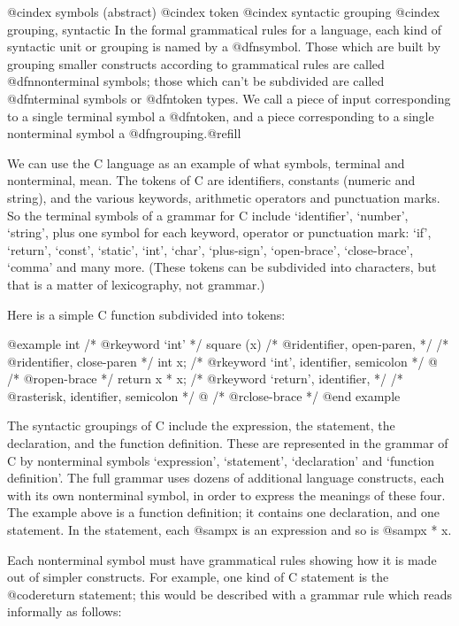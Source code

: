 @cindex symbols (abstract)
@cindex token
@cindex syntactic grouping
@cindex grouping, syntactic
In the formal grammatical rules for a language, each kind of syntactic unit
or grouping is named by a @dfn{symbol}.  Those which are built by grouping
smaller constructs according to grammatical rules are called
@dfn{nonterminal symbols}; those which can't be subdivided are called
@dfn{terminal symbols} or @dfn{token types}.  We call a piece of input
corresponding to a single terminal symbol a @dfn{token}, and a piece
corresponding to a single nonterminal symbol a @dfn{grouping}.@refill

We can use the C language as an example of what symbols, terminal and
nonterminal, mean.  The tokens of C are identifiers, constants (numeric and
string), and the various keywords, arithmetic operators and punctuation
marks.  So the terminal symbols of a grammar for C include `identifier',
`number', `string', plus one symbol for each keyword, operator or
punctuation mark: `if', `return', `const', `static', `int', `char',
`plus-sign', `open-brace', `close-brace', `comma' and many more.  (These
tokens can be subdivided into characters, but that is a matter of
lexicography, not grammar.)

Here is a simple C function subdivided into tokens:

@example
int             /* @r{keyword `int'} */
square (x)      /* @r{identifier, open-paren,} */
                /* @r{identifier, close-paren} */
     int x;     /* @r{keyword `int', identifier, semicolon} */
@{               /* @r{open-brace} */
  return x * x; /* @r{keyword `return', identifier,} */
                /* @r{asterisk, identifier, semicolon} */
@}               /* @r{close-brace} */
@end example

The syntactic groupings of C include the expression, the statement, the
declaration, and the function definition.  These are represented in the
grammar of C by nonterminal symbols `expression', `statement',
`declaration' and `function definition'.  The full grammar uses dozens of
additional language constructs, each with its own nonterminal symbol, in
order to express the meanings of these four.  The example above is a
function definition; it contains one declaration, and one statement.  In
the statement, each @samp{x} is an expression and so is @samp{x * x}.

Each nonterminal symbol must have grammatical rules showing how it is made
out of simpler constructs.  For example, one kind of C statement is the
@code{return} statement; this would be described with a grammar rule which
reads informally as follows:


